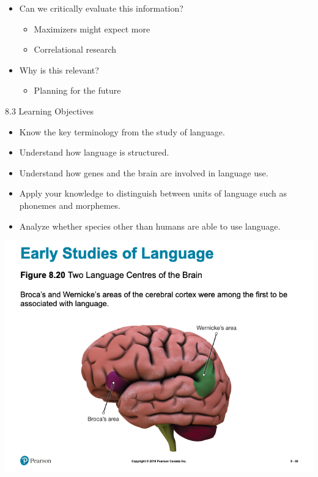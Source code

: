 \documentclass[
]{book}
\providecommand{\tightlist}{%
  \setlength{\itemsep}{0pt}\setlength{\parskip}{0pt}}
\begin{document}
\begin{reflect}
\begin{itemize}
\tightlist
\item
  Can we critically evaluate this information?

  \begin{itemize}
  \tightlist
  \item
    Maximizers might expect more\\
  \item
    Correlational research\\
  \end{itemize}
\item
  Why is this relevant?

  \begin{itemize}
  \tightlist
  \item
    Planning for the future
  \end{itemize}
\end{itemize}

8.3 Learning Objectives

\begin{itemize}
\tightlist
\item
  Know the key terminology from the study of language.\\
\item
  Understand how language is structured.\\
\item
  Understand how genes and the brain are involved in language use.\\
\item
  Apply your knowledge to distinguish between units of language such as phonemes and morphemes.\\
\item
  Analyze whether species other than humans are able to use language.
\end{itemize}

\includegraphics{assets/unit_1/slide_69.png}


\end{reflect}
\end{document}
